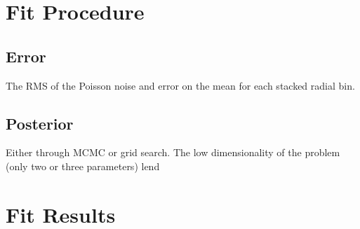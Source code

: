 \documentclass[twocolumn]{article}
\begin{document}
\section{Fit Procedure}

\subsection{Error}
The RMS of the Poisson noise and error on the mean for each stacked radial bin.

\subsection{Posterior}
Either through MCMC or grid search. The low dimensionality of the
problem (only two or three parameters) lend 

\section{Fit Results}

\clearpage
\appendix






\end{document}
